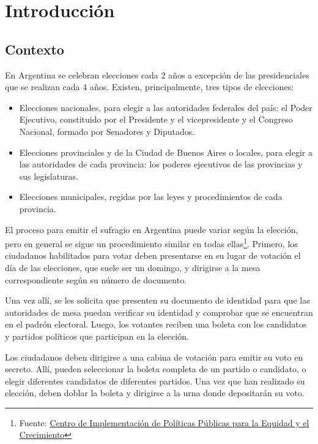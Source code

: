 \chapter{Introducción}

\label{Chapter1}

\section{Contexto}

En Argentina se celebran elecciones cada 2 años a excepción de las presidenciales que se realizan cada 4 años. Existen,
principalmente, tres tipos de elecciones:

\begin{itemize}
    \item Elecciones nacionales, para elegir a las autoridades federales del país: el Poder Ejecutivo, constituido por el
          Presidente y el vicepresidente y el Congreso Nacional, formado por Senadores y Diputados.
    \item Elecciones provinciales y de la Ciudad de Buenos Aires o locales, para elegir a las autoridades de cada provincia: los
          poderes ejecutivos de las provincias y sus legislaturas.
    \item Elecciones municipales, regidas por las leyes y procedimientos de cada provincia.
\end{itemize}

El proceso para emitir el sufragio en Argentina puede variar según la elección, pero en general se sigue un
procedimiento similar en todas ellas\footnote{Fuente: \href{https://www.cippec.org/como-se-cuentan-los-votos/}{Centro
        de Implementación de Políticas Públicas para la Equidad y el Crecimiento}}. Primero, los ciudadanos habilitados para
votar deben presentarse en su lugar de votación el día de las elecciones, que suele ser un domingo, y dirigirse a la
mesa correspondiente según su número de documento.

Una vez allí, se les solicita que presenten su documento de identidad para que las autoridades de mesa puedan verificar
su identidad y comprobar que se encuentran en el padrón electoral. Luego, los votantes reciben una boleta con los
candidatos y partidos políticos que participan en la elección.

Los ciudadanos deben dirigirse a una cabina de votación para emitir su voto en secreto. Allí, pueden seleccionar la
boleta completa de un partido o candidato, o elegir diferentes candidatos de diferentes partidos. Una vez que han
realizado su elección, deben doblar la boleta y dirigirse a la urna donde depositarán su voto.

